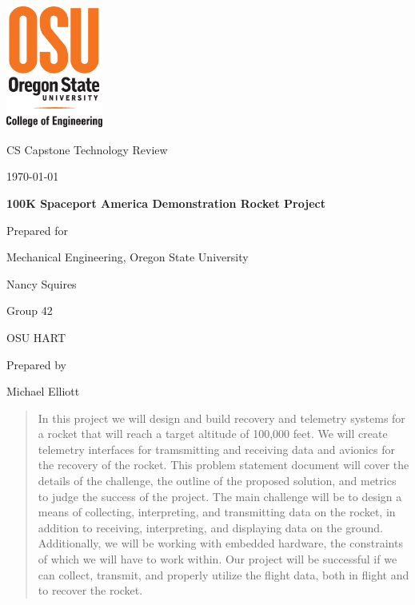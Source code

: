 \documentclass[onecolumn, draftclsnofoot,10pt, compsoc]{IEEEtran}
\def \CapstoneTeamName{		OSU HART}
\def \CapstoneTeamNumber{		42}
\def \GroupMemberOne{			Michael Elliott}
\def \CapstoneProjectName{		100K Spaceport America Demonstration Rocket Project}
\def \CapstoneSponsorCompany{	Mechanical Engineering, Oregon State University}
\def \CapstoneSponsorPerson{		Nancy Squires}
\def \DocType{  %
				Technology Review
				}
\newcommand{\NameSigPair}[1]{\par
\makebox[2.75in][r]{#1} \hfil 	\makebox[3.25in]{\makebox[2.25in]{\hrulefill} \hfill		\makebox[.75in]{\hrulefill}}
\par\vspace{-12pt} \textit{\tiny\noindent
\makebox[2.75in]{} \hfil		\makebox[3.25in]{\makebox[2.25in][r]{Signature} \hfill	\makebox[.75in][r]{Date}}}}
\renewcommand{\NameSigPair}[1]{#1}
\begin{document}
\begin{titlepage}
    \begin{singlespace}
    	\includegraphics[height=4cm]{coe_v_spot1}
        \hfill 
        \par\vspace{.2in}
        \centering
        \scshape{
            \huge CS Capstone \DocType \par
            {\large\today}\par
            \vspace{.5in}
            \textbf{\Huge\CapstoneProjectName}\par
            \vfill
            {\large Prepared for}\par
            \Huge \CapstoneSponsorCompany\par
            \vspace{5pt}
            {\Large\NameSigPair{\CapstoneSponsorPerson}\par}
            Group\CapstoneTeamNumber\par
            \CapstoneTeamName\par 
            {\large Prepared by }\par
            {\Large
                \NameSigPair{\GroupMemberOne}\par
            }
            \vspace{20pt}
        }
        \begin{abstract}
          In this project we will design and build recovery and telemetry systems for a rocket that will reach a target altitude of 100,000 feet.
          We will create telemetry interfaces for tramsmitting and receiving data and avionics for the recovery of the rocket.
          This problem statement document will cover the details of the challenge, the outline of the proposed solution, and metrics to judge the success of the project.
          The main challenge will be to design a means of collecting, interpreting, and transmitting data on the rocket, in addition to receiving, interpreting, and displaying data on the ground.
          Additionally, we will be working with embedded hardware, the constraints of which we will have to work within.
          Our project will be successful if we can collect, transmit, and properly utilize the flight data, both in flight and to recover the rocket.


\end{abstract}
\end{singlespace}
\end{titlepage}
\end{document}
